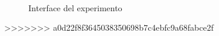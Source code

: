 \begin{figure}[ht]
\begin{center}
\\[0pt]
\caption{Interface del experimento}
\label{fig-interface}
\end{center}
\end{figure}
>>>>>>> a0d22f8f3645038350698b7c4ebfc9a68fabce2f

